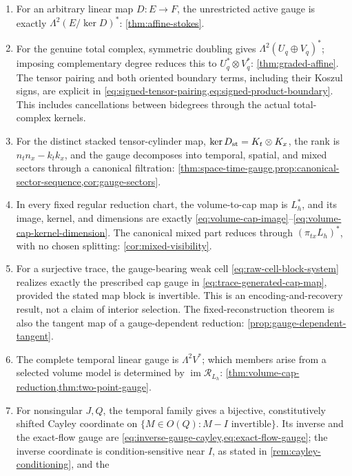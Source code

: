 \documentclass[11pt,a4paper]{article}
\begin{document}
\begin{enumerate}
  \item For an arbitrary linear map \(D:E\to F\), the unrestricted active
  gauge is exactly \(\Lambda^2(E/\ker D)^*\):
  \cref{thm:affine-stokes}.
  \item For the genuine total complex, symmetric doubling gives
  \(\Lambda^2(U_q\oplus V_q)^*\); imposing complementary degree reduces
  this to \(U_q^*\otimes V_q^*\):
  \cref{thm:graded-affine}.  The tensor pairing and both oriented boundary
  terms, including their Koszul signs, are explicit in
  \cref{eq:signed-tensor-pairing,eq:signed-product-boundary}.  This includes
  cancellations between bidegrees through the actual total-complex kernels.
  \item For the distinct stacked tensor-cylinder map,
  \(\ker D_{\rm st}=K_t\otimes K_x\), the rank is
  \(n_tn_x-k_tk_x\), and the gauge decomposes into temporal, spatial, and
  mixed sectors through a canonical filtration:
  \cref{thm:space-time-gauge,prop:canonical-sector-sequence,cor:gauge-sectors}.
  \item In every fixed regular reduction chart, the volume-to-cap map is
  \(L_h^*\), and its image, kernel, and dimensions are exactly
  \cref{eq:volume-cap-image}--\cref{eq:volume-cap-kernel-dimension}.  The
  canonical mixed part reduces through \((\pi_{tx}L_h)^*\), with no chosen
  splitting: \cref{cor:mixed-visibility}.
  \item For a surjective trace, the gauge-bearing weak cell
  \cref{eq:raw-cell-block-system} realizes exactly the prescribed cap
  gauge in \cref{eq:trace-generated-cap-map}, provided the stated map
  block is invertible.  This is an encoding-and-recovery result, not a
  claim of interior selection.  The fixed-reconstruction theorem is also
  the tangent map of a gauge-dependent reduction:
  \cref{prop:gauge-dependent-tangent}.
  \item The complete temporal linear gauge is
  \(\Lambda^2V^*\); which members arise from a selected volume model is
  determined by \(\operatorname{im}\mathcal R_{L_h}\):
  \cref{thm:volume-cap-reduction,thm:two-point-gauge}.
  \item For nonsingular \(J,Q\), the temporal family gives a bijective,
  constitutively shifted Cayley coordinate on
  \(\{M\in O(Q):M-I\text{ invertible}\}\).  Its inverse and the exact-flow
  gauge are \cref{eq:inverse-gauge-cayley,eq:exact-flow-gauge}; the
  inverse coordinate is condition-sensitive near \(I\), as stated in
  \cref{rem:cayley-conditioning}, and the

\end{enumerate}
\end{document}
